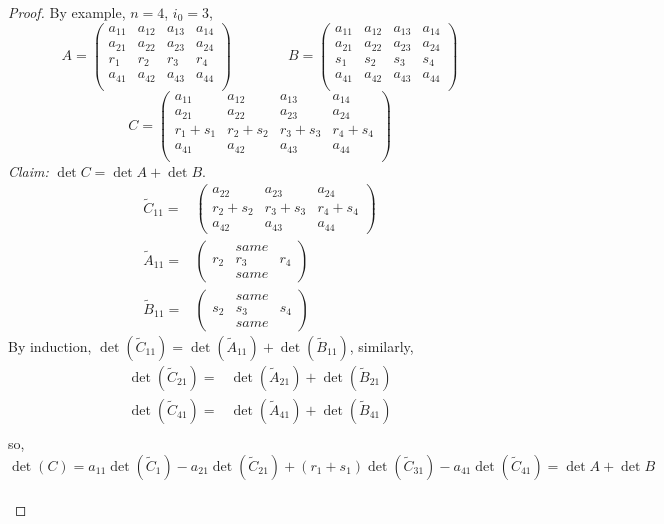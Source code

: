 \documentclass[12pt]{article}
\theoremstyle{plain}
\begin{document}
\begin{proof}
	By example, $n = 4$, $i_0 = 3$, 
	\[
		A = 
		\begin{pmatrix}
			a_{11} & a_{12} & a_{13} & a_{14}	\\
			a_{21} & a_{22} & a_{23} & a_{24}	\\
			r_1	   & r_2    & r_3    & r_4		\\
			a_{41} & a_{42} & a_{43} & a_{44}	\\
		\end{pmatrix}
	\qquad 
	\qquad 
		B = 
		\begin{pmatrix}
			a_{11} & a_{12} & a_{13} & a_{14}	\\
			a_{21} & a_{22} & a_{23} & a_{24}	\\
			s_1	   & s_2    & s_3    & s_4		\\
			a_{41} & a_{42} & a_{43} & a_{44}	\\
		\end{pmatrix}
	\]
	\[
		C = 
		\begin{pmatrix}
			a_{11} & a_{12} & a_{13} & a_{14}	\\
			a_{21} & a_{22} & a_{23} & a_{24}	\\
			r_1+s_1& r_2+s_2& r_3+s_3& r_4+s_4	\\
			a_{41} & a_{42} & a_{43} & a_{44}	\\
		\end{pmatrix}
	\]
	\textit{Claim:} $\det C = \det A + \det B$. 
	\begin{align*}
		\tilde C_{11} =&
		\begin{pmatrix}
			a_{22}	& a_{23}	& a_{24}	\\
			r_2+s_2	& r_3+s_3	& r_4+s_4	\\
			a_{42}	& a_{43}	& a_{44}
		\end{pmatrix}	\\
		\tilde A_{11} =&
		\begin{pmatrix}
				& same &	\\
			r_2 & r_3  & r_4\\
				& same &
		\end{pmatrix}	\\
		\tilde B_{11} =&
		\begin{pmatrix}
				& same &	\\
			s_2 & s_3  & s_4\\
				& same &
		\end{pmatrix}	
	\end{align*}
	By induction, 
	$\det(\tilde C_{11}) = \det(\tilde A_{11}) + \det (\tilde B_{11})$, 
	similarly, 
	\begin{align*}
		\det(\tilde C_{21}) =& \det(\tilde A_{21}) + \det (\tilde B_{21})	\\
		\det(\tilde C_{41}) =& \det(\tilde A_{41}) + \det (\tilde B_{41})	\\
	\end{align*}
	so, 
	\[
		\det(C) = a_{11} \det (\tilde C_1) - a_{21} \det(\tilde C_{21})
		+ (r_1 + s_1) \det(\tilde C_{31}) - a_{41} \det(\tilde C_{41})
		= \det A + \det B
	\]	\\
	
\end{proof}
\end{document}
